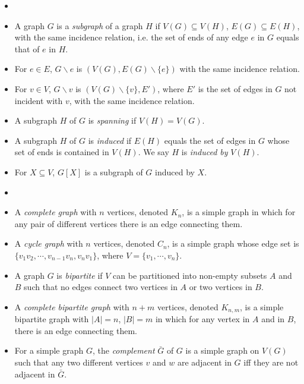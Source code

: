         \begin{defn}[Subgraph] \label{def_subgraph} \begin{itemize}
            \item[]
            \item A graph $G$ is a \emph{subgraph} of a graph $H$ if $V(G) \subseteq V(H)$, $E(G) \subseteq E(H)$, with the same incidence relation, i.e. the set of ends of any edge $e$ in $G$ equals that of $e$ in $H$.
            \item For $e \in E$, $G \backslash e$ is $(V(G), E(G) \backslash \{e\})$ with the same incidence relation.
            \item For $v \in V$, $G \backslash v$ is $(V(G) \backslash \{v\}, E')$, where $E'$ is the set of edges in $G$ not incident with $v$, with the same incidence relation.
            \item A subgraph $H$ of $G$ is \emph{spanning} if $V(H) = V(G)$.
            \item A subgraph $H$ of $G$ is \emph{induced} if $E(H)$ equals the set of edges in $G$ whose set of ends is contained in $V(H)$. We say $H$ is \emph{induced by} $V(H)$.
            \item For $X \subseteq V$, $G[X]$ is a subgraph of $G$ induced by $X$.
        \end{itemize} \end{defn}
        
        \begin{defn}[Examples] \label{def_graph_example} \begin{itemize}
            \item[]
            \item A \emph{complete graph} with $n$ vertices, denoted $K_n$, is a simple graph in which for any pair of different vertices there is an edge connecting them.
            \item A \emph{cycle graph} with $n$ vertices, denoted $C_n$, is a simple graph whose edge set is $\{v_1v_2, \cdots, v_{n-1}v_n, v_nv_1\}$, where $V = \{v_1, \cdots, v_n\}$.
            \item A graph $G$ is \emph{bipartite} if $V$ can be partitioned into non-empty subsets $A$ and $B$ such that no edges connect two vertices in $A$ or two vertices in $B$.
            \item A \emph{complete bipartite graph} with $n+m$ vertices, denoted $K_{n,m}$, is a simple bipartite graph with $|A|=n$, $|B|=m$ in which for any vertex in $A$ and in $B$, there is an edge connecting them.
            \item For a simple graph $G$, the \emph{complement} $\bar{G}$ of $G$ is a simple graph on $V(G)$ such that any two different vertices $v$ and $w$ are adjacent in $G$ iff they are not adjacent in $\bar{G}$.
        \end{itemize} \end{defn}
        

